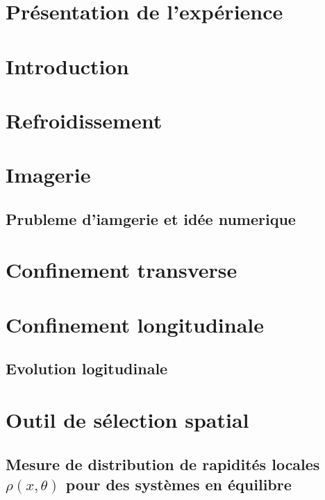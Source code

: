 \section{Présentation de l’expérience}
\section*{Introduction}

\section{Refroidissement}

\section{Imagerie}
\subsection{Prubleme d'iamgerie et idée numerique}

\section{Confinement transverse}

\section{Confinement longitudinale}

\subsection{Evolution logitudinale}

\section{Outil de sélection spatial}

\subsection{Mesure de distribution de rapidités locales $\rho(x , \theta ) $  pour des systèmes en équilibre}


